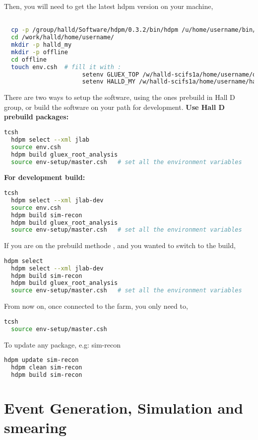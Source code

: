 \documentclass{article}
\begin{document}
Then, you will need to get the latest hdpm version on your machine,
\begin{lstlisting}[language=bash]

  cp -p /group/halld/Software/hdpm/0.3.2/bin/hdpm /u/home/username/bin/  # only first time to update hdpm
  cd /work/halld/home/username/
  mkdir -p halld_my
  mkdir -p offline
  cd offline
  touch env.csh  # fill it with :
                      setenv GLUEX_TOP /w/halld-scifs1a/home/username/offline
                      setenv HALLD_MY /w/halld-scifs1a/home/username/halld_my
\end{lstlisting}

There are two ways to setup the software, using the ones prebuild in Hall D group, or build the software on your path for development.
\newline \textbf{Use Hall D prebuild packages:}
\begin{lstlisting}[language=bash]
  tcsh
  hdpm select --xml jlab
  source env.csh    
  hdpm build gluex_root_analysis
  source env-setup/master.csh   # set all the environment variables
\end{lstlisting}

\textbf{For development build:}
\begin{lstlisting}[language=bash]
  tcsh
  hdpm select --xml jlab-dev
  source env.csh    
  hdpm build sim-recon
  hdpm build gluex_root_analysis
  source env-setup/master.csh   # set all the environment variables
\end{lstlisting}

If you are on the prebuild methode , and you wanted to switch to the build,
\begin{lstlisting}[language=bash]
  hdpm select
  hdpm select --xml jlab-dev
  hdpm build sim-recon
  hdpm build gluex_root_analysis
  source env-setup/master.csh   # set all the environment variables
\end{lstlisting}

From now on, once connected to the farm, you only need to,
\begin{lstlisting}[language=bash]
  tcsh
  source env-setup/master.csh
\end{lstlisting}

To update any package, e.g: sim-recon
\begin{lstlisting}[language=bash]
  hdpm update sim-recon
  hdpm clean sim-recon
  hdpm build sim-recon
\end{lstlisting}

\section{Event Generation, Simulation and smearing}
\end{document}
